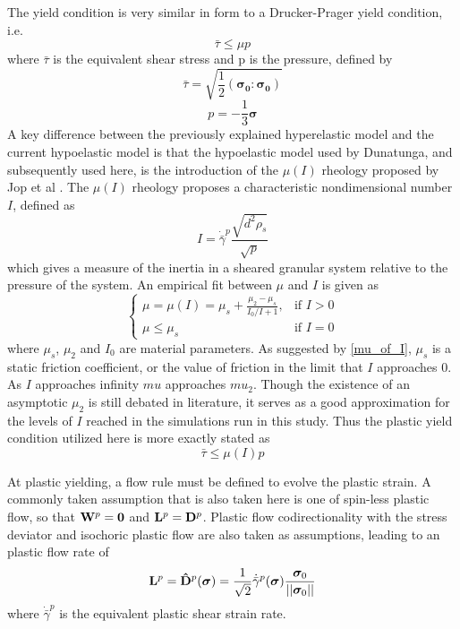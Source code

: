 The yield condition is very similar in form to a Drucker-Prager yield condition, i.e.
\begin{equation}
\bar{\tau} \leq \mu p \label{yield_condition}
\end{equation}
where $\bar{\tau}$ is the equivalent shear stress and p is the pressure, defined by
\begin{equation}
\bar{\tau}=\sqrt{\frac{1}{2}(\bm{\sigma_0}:\bm{\sigma_0})}\label{tau_bar}
\end{equation}
\begin{equation}
p=-\frac{1}{3}\bm{\sigma}\label{pressure_stress}
\end{equation}
A key difference between the previously explained hyperelastic model and the current hypoelastic model is that the hypoelastic model used by Dunatunga, and subsequently used here, is the introduction of the $\mu(I)$ rheology proposed by Jop et al \cite{Jop:2006:Constitutive}. The $\mu(I)$ rheology proposes a characteristic nondimensional number $I$, defined as
\begin{equation}
I=\dot{\bar{\gamma}}^p\frac{\sqrt{d^2\rho_s}}{\sqrt{p}} \label{inertial_number}
\end{equation}
which gives a measure of the inertia in a sheared granular system relative to the pressure of the system. An empirical fit between $\mu$ and $I$ is given as
\begin{equation}
\begin{cases}
	\mu=\mu(I)=\mu_s+\frac{\mu_2-\mu_s}{I_0/I+1}, & \text{if } I>0 \\
	\mu\leq \mu_s								 & \text{if } I=0
\end{cases}
\label{mu_of_I}
\end{equation}
where $\mu_s$, $\mu_2$ and $I_0$ are material parameters. As suggested by \ref{mu_of_I}, $\mu_s$ is a static friction coefficient, or the value of friction in the limit that $I$ approaches 0. As $I$ approaches infinity $mu$ approaches $mu_2$. Though the existence of an asymptotic $\mu_2$ is still debated in literature, it serves as a good approximation for the levels of $I$ reached in the simulations run in this study. Thus the plastic yield condition utilized here is more exactly stated as
\begin{equation}
\bar{\tau} \leq \mu(I) p \label{yield_condition_mu_of_I}
\end{equation}

At plastic yielding, a flow rule must be defined to evolve the plastic strain. A commonly taken assumption that is also taken here is one of spin-less plastic flow, so that $\bold{W}^p=\bold{0}$ and $\bold{L}^p=\bold{D}^p$. Plastic flow codirectionality with the stress deviator and isochoric plastic flow are also taken as assumptions, leading to an plastic flow rate of
\begin{equation}
\bold{L}^p=\bold{\hat{D}}^p(\bm{\sigma})=\frac{1}{\sqrt{2}}\dot{\bar{\gamma}}^p(\bm{\sigma})\frac{\bm{\sigma}_0}{||\bm{\sigma}_0||}\label{flow_rule}
\end{equation}
where $\dot{\bar{\gamma}}^p$ is the equivalent plastic shear strain rate.

